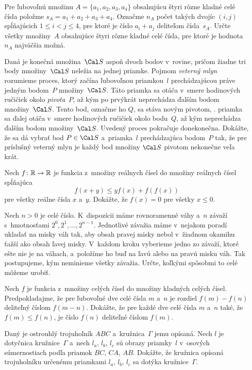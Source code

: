 {%
Pre ľubovoľnú množinu $A = \{a_1, a_2, a_3, a_4\}$ obsahujúcu štyri rôzne kladné celé čísla položme $s_A=a_1+a_2+a_3+a_4$.
Označme $n_A$ počet takých dvojíc $(i, j)$ spĺňajúcich $1\le i<j\le 4$, pre ktoré je číslo $a_i + a_j$ deliteľom čísla~$s_A$.
Určte všetky množiny~$A$ obsahujúce štyri rôzne kladné celé čísla, pre ktoré je hodnota~$n_A$ najväčšia možná.}

{%
Daná je konečná množina~$\Cal S$ aspoň dvoch bodov v~rovine, pričom žiadne tri body množiny~$\Cal S$ neležia na jednej priamke. Pojmom 
{\it veterný mlyn} rozumieme proces, ktorý začína ľubovoľnou priamkou~$l$
prechádzajúcou práve jedným bodom~$P$ množiny~$\Cal S$. Táto priamka sa otáča v~smere hodinových ručičiek okolo {\it pivota}~$P$, až kým po prvýkrát neprechádza ďalším bodom množiny~$\Cal S$. Tento bod, označme ho $Q$, sa stáva novým pivotom, \tj. priamka sa ďalej otáča v~smere hodinových ručičiek okolo bodu~$Q$, až kým neprechádza ďalším bodom množiny~$\Cal S$. Uvedený proces pokračuje donekonečna.
Dokážte, že sa dá vybrať bod $P\in\Cal S$ a~priamka~$l$ prechádzajúca bodom~$P$ tak, že pre príslušný veterný mlyn je každý bod množiny $\Cal S$ pivotom nekonečne veľa krát.}

{%
Nech $f\colon\Bbb R\to\Bbb R$ je funkcia z~množiny reálnych čísel do množiny reálnych čísel spĺňajúca
$$
 f(x+y)\le yf(x)+f(f(x))
$$
pre všetky reálne čísla $x$ a~$y$.
Dokážte, že $f(x)=0$ pre všetky $x\le 0$.}

{%
Nech $n>0$ je celé číslo. K~dispozícii máme rovnoramenné váhy a~$n$ závaží s~hmotnosťami $2^0,2^1, \dots, 2^{n-1}$.
Jednotlivé závažia máme v~nejakom poradí ukladať na misky váh tak, aby obsah pravej misky nebol v~žiadnom okamihu ťažší ako obsah ľavej misky. V~každom kroku vyberieme jedno zo závaží, ktoré ešte nie je na váhach, a~položíme ho buď na ľavú alebo na pravú misku váh. Tak postupujeme, kým neminieme všetky závažia. Určte, koľkými spôsobmi to celé môžeme urobiť.}

{%
Nech $f$ je funkcia z~množiny celých čísel do množiny kladných celých čísel.
Predpokladajme, že pre ľubovoľné dve celé čísla $m$ a~$n$ je rozdiel $f(m)-f(n)$ deliteľný číslom $f(m-n)$.
Dokážte, že pre každé dve celé čísla $m$ a~$n$ také, že $f(m)\le f(n)$, je číslo $f(n)$ deliteľné číslom $f(m)$.}

{%
Daný je ostrouhlý trojuholník $ABC$ a~kružnica~$\Gamma$ jemu opísaná. Nech $l$ je dotyčnica kružnice~$\Gamma$ a~nech
$l_a$, $l_b$, $l_c$ sú obrazy priamky~$l$ v~osových súmernostiach podľa priamok $BC$, $CA$, $AB$.
Dokážte, že kružnica opísaná trojuholníku určenému priamkami $l_a$, $l_b$, $l_c$ sa dotýka kružnice~$\Gamma$.}

